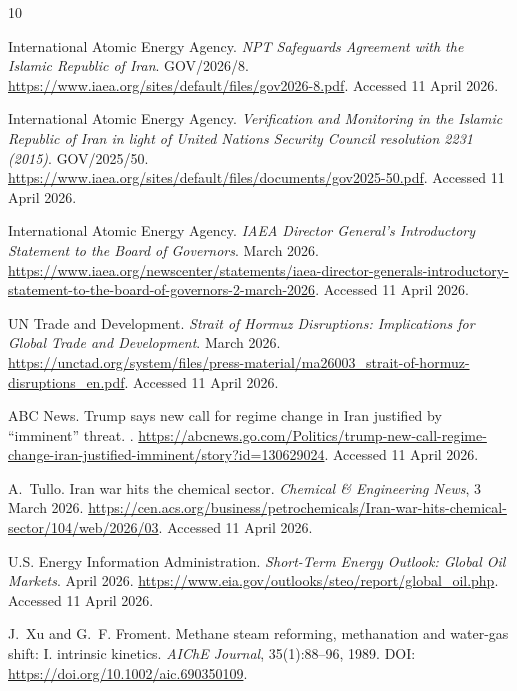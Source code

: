 \documentclass[11pt]{article}
\begin{document}
\begin{thebibliography}{10}

International Atomic Energy Agency.
\newblock \emph{NPT Safeguards Agreement with the Islamic Republic of Iran}.
\newblock GOV/2026/8.
\newblock \url{https://www.iaea.org/sites/default/files/gov2026-8.pdf}. Accessed 11 April 2026.

International Atomic Energy Agency.
\newblock \emph{Verification and Monitoring in the Islamic Republic of Iran in light of United Nations Security Council resolution 2231 (2015)}.
\newblock GOV/2025/50.
\newblock \url{https://www.iaea.org/sites/default/files/documents/gov2025-50.pdf}. Accessed 11 April 2026.

International Atomic Energy Agency.
\newblock \emph{IAEA Director General's Introductory Statement to the Board of Governors}.
 March 2026.
\newblock \url{https://www.iaea.org/newscenter/statements/iaea-director-generals-introductory-statement-to-the-board-of-governors-2-march-2026}. Accessed 11 April 2026.

UN Trade and Development.
\newblock \emph{Strait of Hormuz Disruptions: Implications for Global Trade and Development}.
 March 2026.
\newblock \url{https://unctad.org/system/files/press-material/ma26003_strait-of-hormuz-disruptions_en.pdf}. Accessed 11 April 2026.

ABC News.
\newblock Trump says new call for regime change in Iran justified by ``imminent'' threat.
.
\newblock \url{https://abcnews.go.com/Politics/trump-new-call-regime-change-iran-justified-imminent/story?id=130629024}. Accessed 11 April 2026.

A.~Tullo.
\newblock Iran war hits the chemical sector.
\newblock \emph{Chemical \& Engineering News}, 3 March 2026.
\newblock \url{https://cen.acs.org/business/petrochemicals/Iran-war-hits-chemical-sector/104/web/2026/03}. Accessed 11 April 2026.

U.S. Energy Information Administration.
\newblock \emph{Short-Term Energy Outlook: Global Oil Markets}.
 April 2026.
\newblock \url{https://www.eia.gov/outlooks/steo/report/global_oil.php}. Accessed 11 April 2026.

J.~Xu and G.~F. Froment.
\newblock Methane steam reforming, methanation and water-gas shift: I. intrinsic kinetics.
\newblock \emph{AIChE Journal}, 35(1):88--96, 1989.
\newblock DOI: \url{https://doi.org/10.1002/aic.690350109}.


\end{thebibliography}
\end{document}
